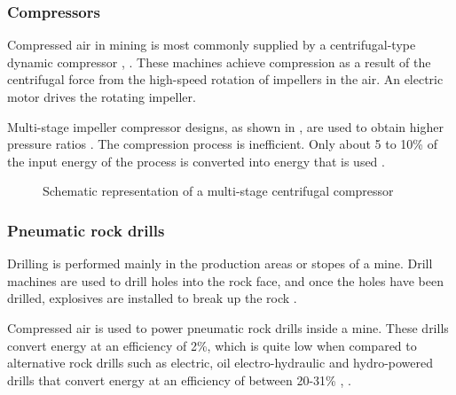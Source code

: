 \subsubsection{Compressors}
Compressed air in mining is most commonly supplied by a centrifugal-type dynamic compressor \cite{Fouche2016Masters}, \cite{Booysen2012Masters}. These machines achieve compression as a result of the centrifugal force from the high-speed rotation of impellers in the air. An electric motor drives the rotating impeller.
\par 
 Multi-stage impeller compressor designs, as shown in , are used to obtain higher  pressure ratios \cite{Fouche2016Masters}. The compression process is inefficient. Only about 5 to 10\% of the input energy of the process is converted into energy that is used \cite{yang2009air}. 
 \clearpage
\begin{figure}[!htbp]
	\centering
	\fbox{\hspace{3cm}\hspace{2.2cm}}
	\caption[Schematic representation of a multi-stage centrifugal compressor]{Schematic representation of a multi-stage centrifugal compressor\protect \footnotemark[1]}
	\label{fig: Compressor diagram}
\end{figure}

\subsubsection{Pneumatic rock drills}
Drilling is performed mainly in the production areas or stopes of a mine. Drill machines are used to drill holes into the rock face, and once the holes have been drilled, explosives are installed to break up the rock \cite{van2008development}.
\par
Compressed air is used to power pneumatic rock drills inside a mine. These drills convert energy at an efficiency of 2\%, which is quite low when compared to alternative rock drills such as electric, oil electro-hydraulic and hydro-powered drills that convert energy at an efficiency of between 20-31\% \cite{fraser2008saving}, \cite{vanTonder2010Masters}. 
